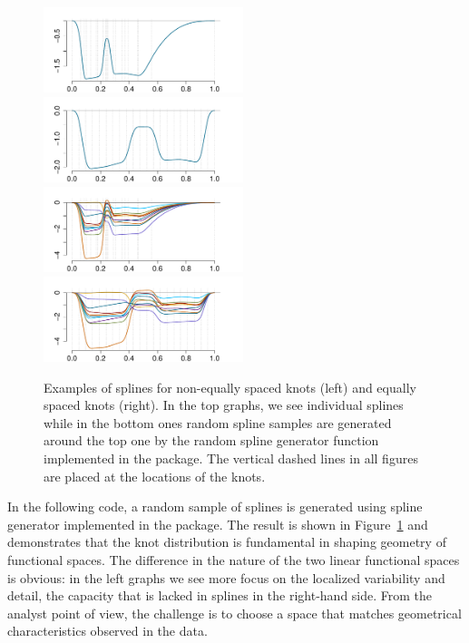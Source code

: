 \begin{figure}
    \centering
    \includegraphics[width=0.52\textwidth]{figures/Fig2LeftTopSpl.pdf}\hspace{-1cm}
     \includegraphics[width=0.52\textwidth]{figures/Fig2RightTopSpl.pdf}\\
      \includegraphics[width=0.52\textwidth]{figures/Fig2LeftBottomSpl.pdf}\hspace{-1cm}
      \includegraphics[width=0.52\textwidth]{figures/Fig2RightBottomSpl.pdf}\\
        \caption{Examples of splines for non-equally spaced knots (left) and equally spaced knots (right). In the top graphs, we see individual splines while in the bottom ones random spline samples are generated around the top one by the random spline generator function implemented in the package.  The vertical dashed lines in all figures are placed at the locations of the knots. }
    \label{fig:splinesp}
\end{figure}

In the following code, a random sample of splines is generated using spline generator implemented in the package.
The result is shown in Figure~\ref{fig:splinesp} and demonstrates that the knot distribution is fundamental in shaping geometry of functional spaces. 
The difference in the nature of the two linear functional spaces  is obvious: in the left graphs we see more focus on the localized variability and detail, the capacity that is lacked in splines in the right-hand side. 
From the analyst point of view, the challenge is to choose a space that matches geometrical characteristics observed in the data. 

